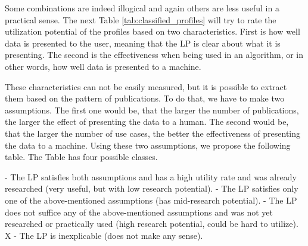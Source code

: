 Some combinations are indeed illogical and again others are less useful in a practical sense.
The next Table \ref{tab:classified_profiles} will try to rate the utilization potential of the profiles based on two characteristics. 
First is how well data is presented to the user,
meaning that the LP is clear about what it is presenting.
The second is the effectiveness when being used in an algorithm, or in other words, how well data is presented to a machine. 

These characteristics can not be easily measured,
but it is possible to extract them based on the pattern of publications.
To do that, we have to make two assumptions.
The first one would be, that the larger the number of publications, the larger the effect of presenting the data to a human.
The second would be, that the larger the number of use cases, the better the effectiveness of presenting the data to a machine.
Using these two assumptions, we propose the following table. 
The Table has four possible classes. 

\begin{outline} 
 - The LP satisfies both assumptions and has a high utility rate and was already researched (very useful, but with low research potential). 
 - The LP satisfies only one of the above-mentioned assumptions (has mid-research potential).
 - The LP does not suffice any of the above-mentioned assumptions and was not yet researched or practically used (high research potential, could be hard to utilize).
\1 X - The LP is inexplicable (does not make any sense).
\end{outline}

